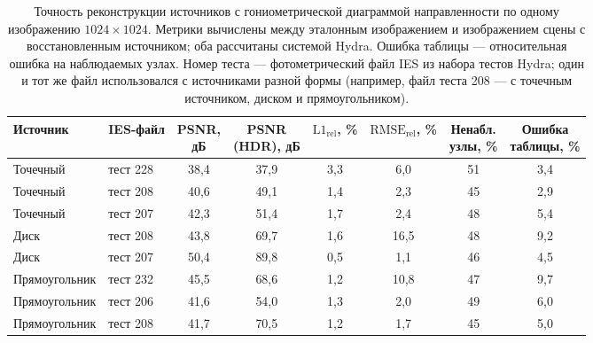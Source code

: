 \begin{table}[htbp]
    \centering
    \small
    \setlength{\tabcolsep}{3.5pt}
    \caption{Точность реконструкции источников с гониометрической диаграммой направленности по одному изображению $1024\times1024$. Метрики вычислены между эталонным изображением и изображением сцены с восстановленным источником; оба рассчитаны системой Hydra. Ошибка таблицы --- относительная ошибка на наблюдаемых узлах. Номер теста --- фотометрический файл IES из набора тестов Hydra; один и тот же файл использовался с источниками разной формы (например, файл теста 208 --- с точечным источником, диском и прямоугольником).}
    \label{tab:ies-results}
    \begin{tabular}{llcccccc}
        \toprule
        Источник & IES-файл & \makecell{PSNR,\\дБ} & \makecell{PSNR\\(HDR), дБ} & \makecell{$\mathrm{L1}_{\mathrm{rel}}$,\\\%} & \makecell{$\mathrm{RMSE}_{\mathrm{rel}}$,\\\%} & \makecell{Ненабл.\\узлы, \%} & \makecell{Ошибка\\таблицы, \%} \\
        \midrule[\heavyrulewidth]
        Точечный      & тест 228 & 38,4 & 37,9 & 3,3 & 6,0  & 51 & 3,4 \\
        Точечный      & тест 208 & 40,6 & 49,1 & 1,4 & 2,3  & 45 & 2,9 \\
        Точечный      & тест 207 & 42,3 & 51,4 & 1,7 & 2,4  & 48 & 5,4 \\
        \midrule
        Диск          & тест 208 & 43,8 & 69,7 & 1,6 & 16,5 & 48 & 9,2 \\
        Диск          & тест 207 & 50,4 & 89,8 & 0,5 & 1,1  & 46 & 4,5 \\
        \midrule
        Прямоугольник & тест 232 & 45,5 & 68,6 & 1,2 & 10,8 & 47 & 9,7 \\
        Прямоугольник & тест 206 & 41,6 & 54,0 & 1,3 & 2,0  & 49 & 6,0 \\
        Прямоугольник & тест 208 & 41,7 & 70,5 & 1,2 & 1,7  & 45 & 5,0 \\
        \bottomrule
    \end{tabular}
\end{table}

